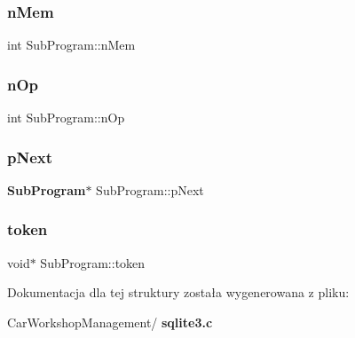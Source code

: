 \mbox{\label{struct_sub_program_a9bece42fdeb81085809d7c2f8aa05616}} 
\subsubsection{nMem}
{\footnotesize\ttfamily int Sub\+Program\+::n\+Mem}

\mbox{\label{struct_sub_program_a6fe204a75ab8254c453be77f024b6d69}} 
\subsubsection{nOp}
{\footnotesize\ttfamily int Sub\+Program\+::n\+Op}

\mbox{\label{struct_sub_program_a7da35488ac58a64fa30b88da56aac8b3}} 
\subsubsection{pNext}
{\footnotesize\ttfamily \textbf{ Sub\+Program}$\ast$ Sub\+Program\+::p\+Next}

\mbox{\label{struct_sub_program_aaea3b67899b092476b107d22a4e2022d}} 
\subsubsection{token}
{\footnotesize\ttfamily void$\ast$ Sub\+Program\+::token}



Dokumentacja dla tej struktury została wygenerowana z pliku\+:\begin{DoxyCompactItemize}
\item 
Car\+Workshop\+Management/\textbf{ sqlite3.\+c}\end{DoxyCompactItemize}

